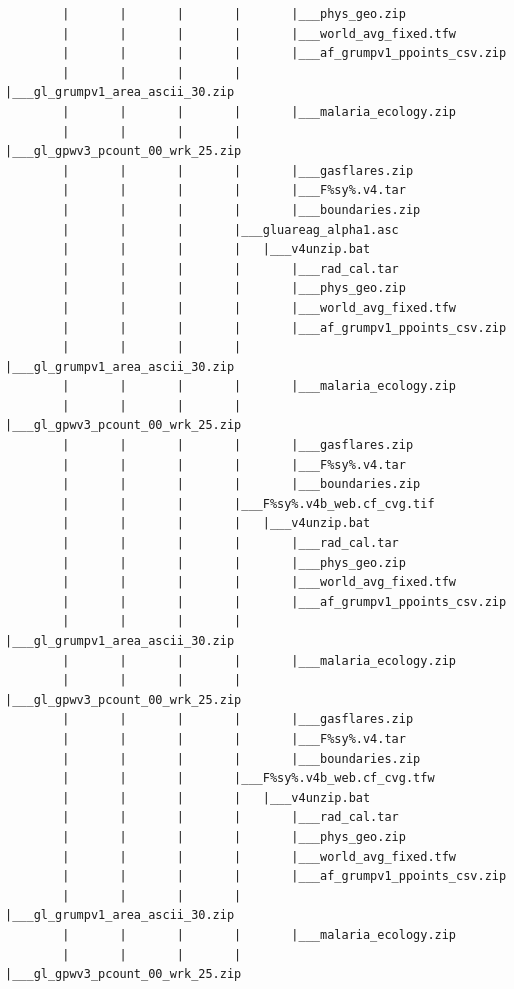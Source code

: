 \documentclass[]{book}
\begin{document}
\begin{verbatim}
        |       |       |       |       |___phys_geo.zip
        |       |       |       |       |___world_avg_fixed.tfw
        |       |       |       |       |___af_grumpv1_ppoints_csv.zip
        |       |       |       |       |___gl_grumpv1_area_ascii_30.zip
        |       |       |       |       |___malaria_ecology.zip
        |       |       |       |       |___gl_gpwv3_pcount_00_wrk_25.zip
        |       |       |       |       |___gasflares.zip
        |       |       |       |       |___F%sy%.v4.tar
        |       |       |       |       |___boundaries.zip
        |       |       |       |___gluareag_alpha1.asc
        |       |       |       |   |___v4unzip.bat
        |       |       |       |       |___rad_cal.tar
        |       |       |       |       |___phys_geo.zip
        |       |       |       |       |___world_avg_fixed.tfw
        |       |       |       |       |___af_grumpv1_ppoints_csv.zip
        |       |       |       |       |___gl_grumpv1_area_ascii_30.zip
        |       |       |       |       |___malaria_ecology.zip
        |       |       |       |       |___gl_gpwv3_pcount_00_wrk_25.zip
        |       |       |       |       |___gasflares.zip
        |       |       |       |       |___F%sy%.v4.tar
        |       |       |       |       |___boundaries.zip
        |       |       |       |___F%sy%.v4b_web.cf_cvg.tif
        |       |       |       |   |___v4unzip.bat
        |       |       |       |       |___rad_cal.tar
        |       |       |       |       |___phys_geo.zip
        |       |       |       |       |___world_avg_fixed.tfw
        |       |       |       |       |___af_grumpv1_ppoints_csv.zip
        |       |       |       |       |___gl_grumpv1_area_ascii_30.zip
        |       |       |       |       |___malaria_ecology.zip
        |       |       |       |       |___gl_gpwv3_pcount_00_wrk_25.zip
        |       |       |       |       |___gasflares.zip
        |       |       |       |       |___F%sy%.v4.tar
        |       |       |       |       |___boundaries.zip
        |       |       |       |___F%sy%.v4b_web.cf_cvg.tfw
        |       |       |       |   |___v4unzip.bat
        |       |       |       |       |___rad_cal.tar
        |       |       |       |       |___phys_geo.zip
        |       |       |       |       |___world_avg_fixed.tfw
        |       |       |       |       |___af_grumpv1_ppoints_csv.zip
        |       |       |       |       |___gl_grumpv1_area_ascii_30.zip
        |       |       |       |       |___malaria_ecology.zip
        |       |       |       |       |___gl_gpwv3_pcount_00_wrk_25.zip

\end{verbatim}
\end{document}
